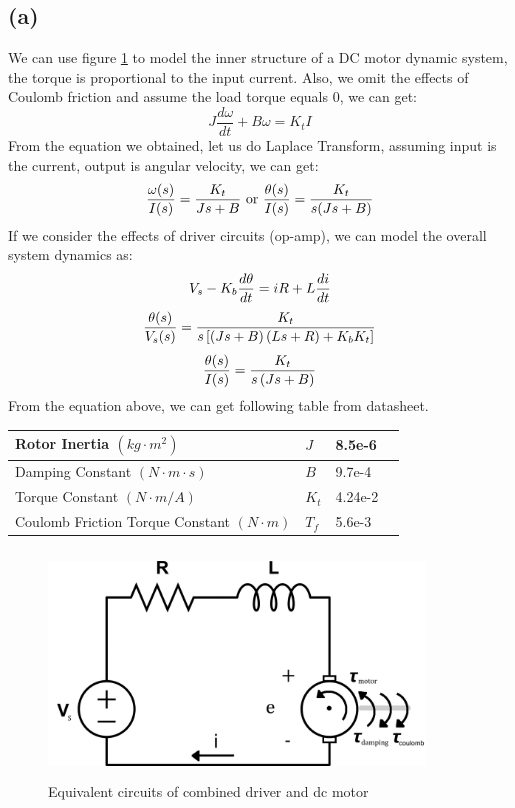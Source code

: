 \documentclass[letterpaper]{article}
\begin{document}
\subsection*{(a)}
We can use figure \ref{q2_1} to model the inner structure of a DC motor dynamic system, the torque is proportional to the input current. Also, we omit the effects of Coulomb friction and assume the load torque equals 0, we can get:\\
$$J\frac{d\omega }{dt}+B\omega =K_tI$$
From the equation we obtained, let us do Laplace Transform, assuming input is the current, output is angular velocity, we can get:\\
$$\frac{\omega (s)}{I(s)}=\frac{K_t}{Js+B} \text{ or } \frac{\displaystyle \theta(s)}{\displaystyle I(s)} = \frac{\displaystyle K_t}{\displaystyle s(Js+B)}$$
If we consider the effects of driver circuits (op-amp), we can model the overall system dynamics as:\\
$$V_s - K_b\frac{\displaystyle d\theta}{\displaystyle dt} = iR + L\frac{\displaystyle di}{\displaystyle dt}$$
$$\frac{\displaystyle \theta(s)}{\displaystyle V_s(s)} = \frac{\displaystyle K_t}{\displaystyle s\left[\left(Js+B\right)\left(Ls+R\right)+K_bK_t\right]}$$
$$\frac{\displaystyle \theta(s)}{\displaystyle I(s)} = \frac{\displaystyle K_t}{\displaystyle s\left(Js+B\right)}$$
From the equation above, we can get following table from datasheet.\\
\begin{center}
    \begin{tabular}{ | l | l | l | p{5cm} |}
    \hline
    Rotor Inertia $(kg\cdot m^2)$ & $J$ & 8.5e-6 \\ \hline
    Damping Constant $(N\cdot m\cdot s)$ & $B$ & 9.7e-4\\ \hline
    Torque Constant $(N\cdot m/A)$ & $K_t$ & 4.24e-2 \\ \hline
    Coulomb Friction Torque Constant $(N\cdot m)$ & $T_f$ & 5.6e-3 \\ \hline
    \end{tabular}
\end{center}
\begin{figure}[H]
	\centering
	\includegraphics[width = 10cm, height = 6cm]{dcmotor.png}
	\caption{Equivalent circuits of combined driver and dc motor}
	\label{q2_1}
\end{figure}
\end{document}
